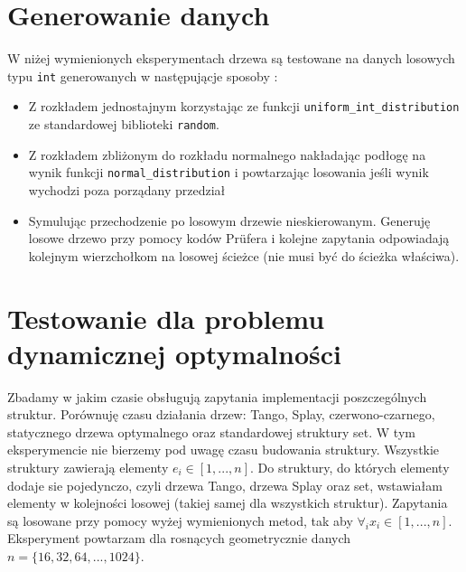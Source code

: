 \documentclass[declaration,shortabstract]{iithesis}
\theoremstyle{thm}
\theoremstyle{remark}
\theoremstyle{plain}
\theoremstyle{plain}
\theoremstyle{plain}
\begin{document}
\section{Generowanie danych}
W niżej wymienionych eksperymentach drzewa są testowane na danych losowych typu \texttt{int} generowanych w następującje sposoby : 
\begin{itemize}
\item{Z rozkładem jednostajnym korzystając ze funkcji \texttt{uniform\_int\_distribution} ze standardowej biblioteki \texttt{random}.}
\item{Z rozkładem zbliżonym do rozkładu normalnego nakładając podłogę na wynik funkcji \texttt{normal\_distribution} i powtarzając losowania jeśli wynik wychodzi poza porządany przedział}
\item{Symulując przechodzenie po losowym drzewie nieskierowanym. Generuję losowe drzewo przy pomocy kodów Prüfera i kolejne zapytania odpowiadają kolejnym wierzchołkom na losowej ścieżce (nie musi być do ścieżka właściwa).}
\end{itemize}

\section{Testowanie dla problemu dynamicznej optymalności}
Zbadamy w jakim czasie obsługują zapytania implementacji poszczególnych struktur. Porównuję czasu działania drzew: Tango, Splay, czerwono-czarnego, statycznego drzewa optymalnego oraz standardowej struktury set. W tym eksperymencie nie bierzemy pod uwagę czasu budowania struktury. Wszystkie struktury zawierają elementy \(e_i \in [1, ..., n]\). Do struktury, do których elementy dodaje sie pojedynczo, czyli drzewa Tango, drzewa Splay oraz set, wstawiałam elementy w kolejności losowej (takiej samej dla wszystkich struktur). Zapytania są losowane przy pomocy wyżej wymienionych metod, tak aby \(\forall_i x_i \in [1, ..., n]\). Eksperyment powtarzam dla rosnących geometrycznie danych \( n = \{16, 32, 64, ..., 1024\}\). 

\end{document}
